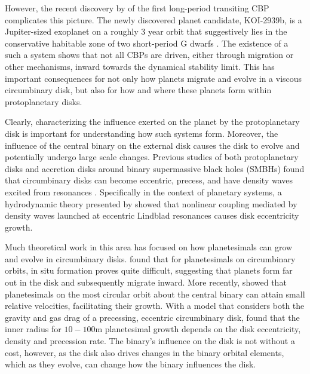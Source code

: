However, the recent discovery by \citet{Kostov2016} of the first long-period transiting CBP complicates this picture.  The newly discovered planet candidate, KOI-2939b, is a Jupiter-sized exoplanet on a roughly 3 year orbit that suggestively lies in the conservative habitable zone of two short-period G dwarfs \citep{Kostov2016}.  The existence of a such a system shows that not all CBPs are driven, either through migration or other mechanisms, inward towards the dynamical stability limit.  This has important consequences for not only how planets migrate and evolve in a viscous circumbinary disk, but also for how and where these planets form within protoplanetary disks.

Clearly, characterizing the influence exerted on the planet by the protoplanetary disk is important for understanding how such systems form.  Moreover, the influence of the central binary on the external disk causes the disk to evolve and potentially undergo large scale changes.  Previous studies of both protoplanetary disks and accretion disks around binary supermassive black holes (SMBHs) found that circumbinary disks can become eccentric, precess, and have density waves excited from resonances \citep{Dunhill2015,MacFadyen2008,Papaloizou2001,Pierens2007,Pierens2013,Roedig2012}.  Specifically in the context of planetary systems, a hydrodynamic theory presented by \citet{Lubow1991} showed that nonlinear coupling mediated by density waves launched at eccentric Lindblad resonances causes disk eccentricity growth. 

Much theoretical work in this area has focused on how planetesimals
can grow and evolve in circumbinary disks.  \citet{Paardekooper2012}
found that for planetesimals on circumbinary orbits, in situ formation
proves quite difficult, suggesting that planets form far out in the
disk and subsequently migrate inward.  More recently, \citet{Bromley2015}
showed that planetesimals on the most circular orbit about the central
binary can attain small relative velocities, facilitating their growth.
With a model that considers both the gravity and gas drag of a
precessing, eccentric circumbinary disk, \citet{Silsbee2015a} found that
the inner radius for $10-100$m planetesimal growth depends on the disk eccentricity, density and precession rate.  The binary's influence on the disk is not without a cost, however, as the disk also drives changes in the binary orbital elements, which as they evolve, can change how the binary influences the disk.


